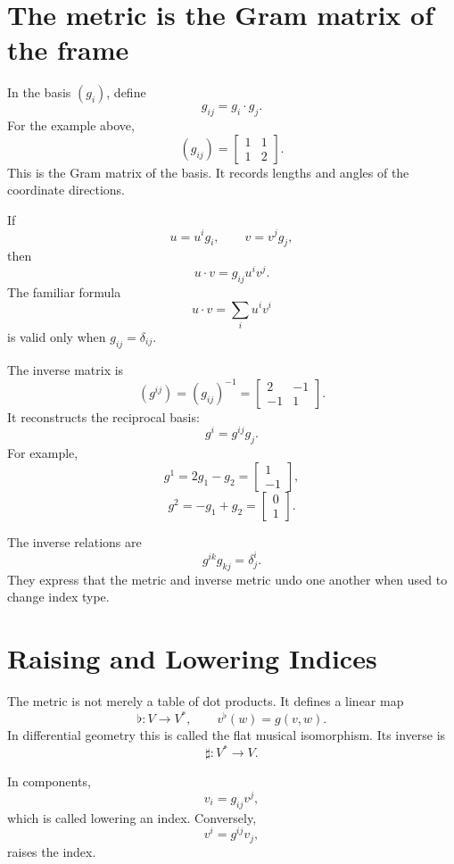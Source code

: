 \section{The metric is the Gram matrix of the frame}

In the basis \((g_i)\), define
\[
  g_{ij}=g_i\cdot g_j.
\]
For the example above,
\[
  (g_{ij})=
  \begin{bmatrix}
    1&1\\
    1&2
  \end{bmatrix}.
\]
This is the Gram matrix of the basis.  It records lengths and angles of the coordinate directions.

If
\[
  u=u^ig_i,
  \qquad
  v=v^jg_j,
\]
then
\[
  u\cdot v=g_{ij}u^iv^j.
\]
The familiar formula
\[
  u\cdot v=\sum_i u^iv^i
\]
is valid only when \(g_{ij}=\delta_{ij}\).

The inverse matrix is
\[
  (g^{ij})=(g_{ij})^{-1}
  =
  \begin{bmatrix}
    2&-1\\
    -1&1
  \end{bmatrix}.
\]
It reconstructs the reciprocal basis:
\[
  g^i=g^{ij}g_j.
\]
For example,
\[
  g^1=2g_1-g_2
  =
  \begin{bmatrix}1\\-1\end{bmatrix},
\]
\[
  g^2=-g_1+g_2
  =
  \begin{bmatrix}0\\1\end{bmatrix}.
\]

The inverse relations are
\[
  g^{ik}g_{kj}=\delta^i_j.
\]
They express that the metric and inverse metric undo one another when used to change index type.

\section{Raising and Lowering Indices}

The metric is not merely a table of dot products.  It defines a linear map
\[
  \flat:V\longrightarrow V^*,
  \qquad
  v^\flat(w)=g(v,w).
\]
In differential geometry this is called the flat musical isomorphism.  Its inverse is
\[
  \sharp:V^*\longrightarrow V.
\]

In components,
\[
  v_i=g_{ij}v^j,
\]
which is called lowering an index.  Conversely,
\[
  v^i=g^{ij}v_j,
\]
raises the index.

